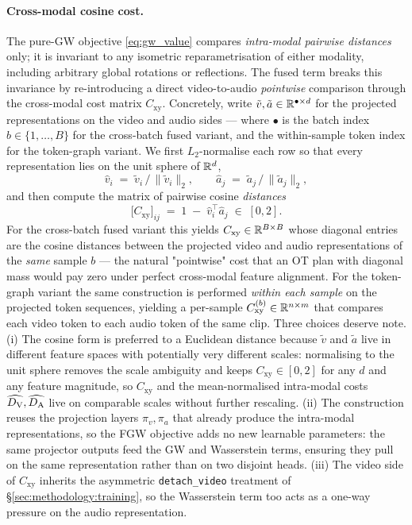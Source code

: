 \paragraph{Cross-modal cosine cost.}
The pure-GW objective \eqref{eq:gw_value} compares
\emph{intra-modal pairwise distances} only; it is invariant to any
isometric reparametrisation of either modality, including
arbitrary global rotations or reflections. The fused term breaks
this invariance by re-introducing a direct video-to-audio
\emph{pointwise} comparison through the cross-modal cost matrix
$C_{\mathrm{xy}}$. Concretely, write
$\tilde v, \tilde a \in \mathbb{R}^{\bullet \times d}$ for the projected
representations on the video and audio sides --- where $\bullet$
is the batch index $b \in \{1,\dots,B\}$ for the cross-batch
fused variant, and the within-sample token index for the
token-graph variant. We first $L_2$-normalise each row so that
every representation lies on the unit sphere of $\mathbb{R}^d$,
\begin{equation}
  \hat v_i \;=\; \tilde v_i \,/\, \lVert \tilde v_i \rVert_2,
  \qquad
  \hat a_j \;=\; \tilde a_j \,/\, \lVert \tilde a_j \rVert_2,
  \label{eq:l2norm}
\end{equation}
and then compute the matrix of pairwise cosine \emph{distances}
\begin{equation}
  \bigl[C_{\mathrm{xy}}\bigr]_{ij}
  \;=\;
  1 \;-\; \hat v_i^{\!\top} \hat a_j
  \;\in\; [0, 2].
  \label{eq:ccross}
\end{equation}
For the cross-batch fused variant this yields
$C_{\mathrm{xy}} \in \mathbb{R}^{B \times B}$ whose diagonal entries are
the cosine distances between the projected video and audio
representations of the \emph{same} sample $b$ --- the natural
"pointwise" cost that an OT plan with diagonal mass would pay zero
under perfect cross-modal feature alignment. For
the token-graph variant the same construction is performed
\emph{within each sample} on the projected token sequences,
yielding a per-sample $C_{\mathrm{xy}}^{(b)} \in \mathbb{R}^{n \times m}$
that compares each video token to each audio token of the same
clip. Three choices deserve note. (i) The cosine form is preferred
to a Euclidean distance because $\tilde v$ and $\tilde a$ live in
different feature spaces with potentially very different scales:
normalising to the unit sphere removes the scale ambiguity and
keeps $C_{\mathrm{xy}} \in [0, 2]$ for any $d$ and any feature
magnitude, so $C_{\mathrm{xy}}$ and the mean-normalised intra-modal
costs $\widehat{D_{\mathrm{V}}}, \widehat{D_{\mathrm{A}}}$ live on comparable scales without
further rescaling. (ii) The construction reuses the projection
layers $\pi_v, \pi_a$ that already produce the intra-modal
representations, so the FGW objective adds no new learnable
parameters: the same projector outputs feed the GW and Wasserstein
terms, ensuring they pull on the same representation rather than on
two disjoint heads. (iii) The video side of $C_{\mathrm{xy}}$
inherits the asymmetric \texttt{detach\_video} treatment of
\S\ref{sec:methodology:training}, so the Wasserstein term too acts
as a one-way pressure on the audio representation.

